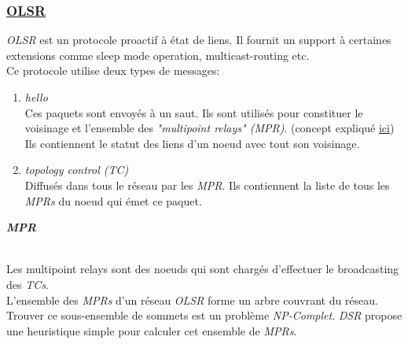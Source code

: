 \documentclass[a4paper, 12pt]{report}
\begin{document}
    \vspace{1cm}
    \subsubsection{\underline{OLSR}}
        \textit{OLSR} est un protocole proactif à état de liens. Il fournit un support à certaines extensions comme
        sleep mode operation, multicast-routing etc.\\
        Ce protocole utilise deux types de messages:\\
        \begin{enumerate}
            \item \textit{hello}\\
                Ces paquets sont envoyés à un saut. Ils sont utilisés pour constituer le voisinage et
                l'ensemble des \textit{"multipoint relays" (MPR)}. (concept expliqué  \hyperlink{mpr}{ici})\\
                Ils contiennent le statut des liens d'un noeud avec tout son voisinage.
            \item \textit{topology control (TC)}\\
                Diffusés dans tous le réseau par les \textit{MPR}. Ils contiennent la liste de tous les \textit{MPRs}
                du noeud qui émet ce paquet.
        \end{enumerate}
        \hypertarget{mpr}{\textit{\textbf{MPR}}}\\
        Les multipoint relays sont des noeuds qui sont chargés d'effectuer le broadcasting des \textit{TCs}. \\
        L'ensemble des \textit{MPRs} d'un réseau \textit{OLSR} forme un arbre couvrant du réseau. Trouver ce sous-ensemble de sommets
        est un problème \textit{NP-Complet}. \textit{DSR} propose une heuristique simple pour calculer cet ensemble de \textit{MPRs}.\\
        
\end{document}
